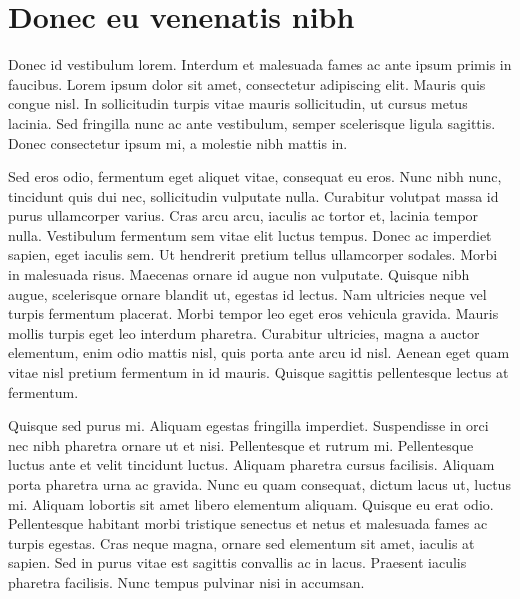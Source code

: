 \chapter{Donec eu venenatis nibh}

Donec id vestibulum lorem. Interdum et malesuada fames ac ante ipsum primis in faucibus. Lorem ipsum dolor sit amet, consectetur adipiscing elit. Mauris quis congue nisl. In sollicitudin turpis vitae mauris sollicitudin, ut cursus metus lacinia. Sed fringilla nunc ac ante vestibulum, semper scelerisque ligula sagittis. Donec consectetur ipsum mi, a molestie nibh mattis in.

Sed eros odio, fermentum eget aliquet vitae, consequat eu eros. Nunc nibh nunc, tincidunt quis dui nec, sollicitudin vulputate nulla. Curabitur volutpat massa id purus ullamcorper varius. Cras arcu arcu, iaculis ac tortor et, lacinia tempor nulla. Vestibulum fermentum sem vitae elit luctus tempus. Donec ac imperdiet sapien, eget iaculis sem. Ut hendrerit pretium tellus ullamcorper sodales. Morbi in malesuada risus. Maecenas ornare id augue non vulputate. Quisque nibh augue, scelerisque ornare blandit ut, egestas id lectus. Nam ultricies neque vel turpis fermentum placerat. Morbi tempor leo eget eros vehicula gravida. Mauris mollis turpis eget leo interdum pharetra. Curabitur ultricies, magna a auctor elementum, enim odio mattis nisl, quis porta ante arcu id nisl. Aenean eget quam vitae nisl pretium fermentum in id mauris. Quisque sagittis pellentesque lectus at fermentum.

Quisque sed purus mi. Aliquam egestas fringilla imperdiet. Suspendisse in orci nec nibh pharetra ornare ut et nisi. Pellentesque et rutrum mi. Pellentesque luctus ante et velit tincidunt luctus. Aliquam pharetra cursus facilisis. Aliquam porta pharetra urna ac gravida. Nunc eu quam consequat, dictum lacus ut, luctus mi. Aliquam lobortis sit amet libero elementum aliquam. Quisque eu erat odio. Pellentesque habitant morbi tristique senectus et netus et malesuada fames ac turpis egestas. Cras neque magna, ornare sed elementum sit amet, iaculis at sapien. Sed in purus vitae est sagittis convallis ac in lacus. Praesent iaculis pharetra facilisis. Nunc tempus pulvinar nisi in accumsan. 